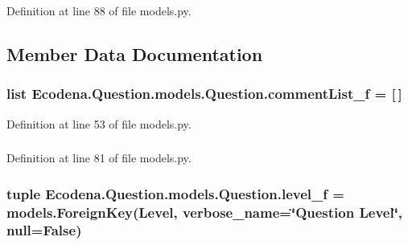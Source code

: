 Definition at line 88 of file models.py.



\subsection{Member Data Documentation}
\hypertarget{class_ecodena_1_1_question_1_1models_1_1_question_ae202257a6a3b5630cd345936d8e258c3}{
\subsubsection[{commentList\_\-f}]{\setlength{\rightskip}{0pt plus 5cm}list {\bf Ecodena.Question.models.Question.commentList\_\-f} = \mbox{[}$\,$\mbox{]}}}
\label{d1/d67/class_ecodena_1_1_question_1_1models_1_1_question_ae202257a6a3b5630cd345936d8e258c3}


Definition at line 53 of file models.py.

\hypertarget{class_ecodena_1_1_question_1_1models_1_1_question_a4bd58a5bfd741f2442344987976725b2}{
\subsubsection[{commentList\_\-f}]{}}
\label{d1/d67/class_ecodena_1_1_question_1_1models_1_1_question_a4bd58a5bfd741f2442344987976725b2}


Definition at line 81 of file models.py.

\hypertarget{class_ecodena_1_1_question_1_1models_1_1_question_a6dfb4e057e2757e3ea7387fa9aa6b741}{
\subsubsection[{level\_\-f}]{\setlength{\rightskip}{0pt plus 5cm}tuple {\bf Ecodena.Question.models.Question.level\_\-f} = models.ForeignKey({\bf Level}, verbose\_\-name=\char`\"{}Question {\bf Level}\char`\"{}, null=False)}}
\label{d1/d67/class_ecodena_1_1_question_1_1models_1_1_question_a6dfb4e057e2757e3ea7387fa9aa6b741}



